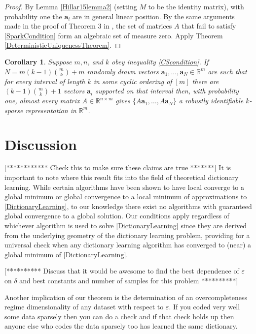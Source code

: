 \documentclass[journal, onecolumn]{IEEEtran}
\newtheorem{corollary}{Corollary}
\begin{document}
\begin{proof}
By Lemma \ref{Hillar15lemma2} (setting $M$ to be the identity matrix), with probability one the $\mathbf{a}_i$ are in general linear position. By the same arguments made in the proof of Theorem 3 in \cite{Hillar15}, the set of matrices $A$ that fail to satisfy \eqref{SparkCondition} form an algebraic set of measure zero. Apply Theorem \ref{DeterministicUniquenessTheorem}.
\end{proof}

\begin{corollary}
Suppose $m, n$, and $k$ obey inequality \eqref{CScondition}.  If $N = m(k-1){m \choose k}+m$ randomly drawn vectors $\mathbf{a}_1, \ldots, \mathbf{a}_N \in \mathbb{R}^m$ are such that for every interval of length $k$ in some cyclic ordering of $[m]$ there are $(k-1){m \choose k}+1$ vectors $\mathbf{a}_i$ supported on that interval then, with probability one, almost every matrix $A \in \mathbb{R}^{n \times m}$ gives $\{A\mathbf{a}_1, \ldots , A\mathbf{a}_N \}$ a robustly identifiable $k$-sparse representation in $\mathbb{R}^m$.
\end{corollary}



\section{Discussion}

[************ Check this to make sure these claims are true *******]
It is important to note where this result fits into the field of theoretical dictionary learning. While certain algorithms have been shown to have local converge to a global minimum or global convergence to a local minimum of approximations to \eqref{DictionaryLearning}, to our knowledge there exist no algorithms with guaranteed global convergence to a global solution. Our conditions apply regardless of whichever algorithm is used to solve \eqref{DictionaryLearning} since they are derived from the underlying geometry of the dictionary learning problem, providing for a universal check when any dictionary learning algorithm has converged to (near) a global minimum of \eqref{DictionaryLearning}.

[********** Discuss that it would be awesome to find the best dependence of $\varepsilon$ on $\delta$ and best constants and number of samples for this problem **********]


Another implication of our theorem is the determination of an overcompleteness regime dimensionality of any dataset with respect to $\varepsilon$. If you coded very well some data sparsely then you can do a check and if that check holds up then anyone else who codes the data sparsely too has learned the same dictionary. 
\end{document}

